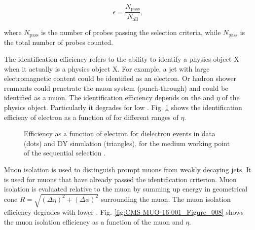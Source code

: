 \begin{description}
\begin{equation}
\epsilon=\frac{N_{\text{pass}}}{N_{\text{all}}},
\end{equation}

where $N_{\text{pass}}$ is the number of probes passing the selection criteria, while $N_{\text{pass}}$ is the total number of probes counted.

The identification efficiency refers to the ability to identify a physics object X when it actually is a physics object X. For example, a jet with large electromagnetic content could be identified as an electron. Or hadron shower remnants could penetrate the muon system (punch-through) and could be identified as a muon. The identification efficiency depends on the \pt and $\eta$ of the physics object. Particularly it degrades for low \pt. Fig. \ref{fig:CMS-EGM-13-001_Figure_024} shows the identification efficieny of electron as a function of \pt for different ranges of $\eta$.

\begin{figure}[htp]
\centering
  \def\twidth{0.45}
  \centering
  \hfil
\caption{Efficiency as a function of electron \pt for dielectron events in data (dots) and DY simulation (triangles), for the medium working point of the sequential selection \cite{Khachatryan:2015hwa}.}
\label{fig:CMS-EGM-13-001_Figure_024}
\end{figure}

Muon isolation is used to distinguish prompt muons from weakly decaying jets. It is used for muons that have already passed the identification criterion. Muon isolation is evaluated relative to the muon \pt by summing up energy in geometrical cone $R=\sqrt{(\Delta\eta)^{2} + (\Delta\phi)^{2}}$ surrounding the muon. The muon isolation efficiency degrades with lower \pt. Fig. \ref{fig:CMS-MUO-16-001_Figure_008} shows the muon isolation efficiency as a function of the muon \pt and $\eta$. 


\end{description}
